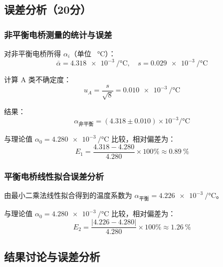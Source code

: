 \documentclass{../template/Report}%
\begin{document}
\begin{fullreportonly}
    \subsection{误差分析（20分）}

    \subsubsection{非平衡电桥测量的统计与误差}
    对非平衡电桥所得 $\alpha_i$（单位 \si{\per\degreeCelsius}）：
    \begin{equation}
        \bar{\alpha} = \SI{4.318e-3}{\per\degreeCelsius}, \quad s = \SI{0.029e-3}{\per\degreeCelsius}
    \end{equation}

    计算 A 类不确定度：
    \begin{equation}
        u_A = \frac{s}{\sqrt{8}} = \SI{0.010e-3}{\per\degreeCelsius}
    \end{equation}

    结果：
    \begin{equation}
        \alpha_{\text{非平衡}} = (\num{4.318} \pm \num{0.010}) \times 10^{-3} \si{\per\degreeCelsius}
    \end{equation}

    与理论值 $\alpha_{0} = \SI{4.280e-3}{\per\degreeCelsius}$ 比较，相对偏差为：
    \begin{equation}
        E_1 = \frac{4.318 - 4.280}{4.280} \times 100\% \approx \SI{0.89}{\percent}
    \end{equation}

    \subsubsection{平衡电桥线性拟合误差分析}
    由最小二乘法线性拟合得到的温度系数为 $\alpha_{\text{平衡}} = \SI{4.226e-3}{\per\degreeCelsius}$。

    与理论值 $\alpha_{0} = \SI{4.280e-3}{\per\degreeCelsius}$ 比较，相对偏差为：
    \begin{equation}
        E_2 = \frac{\left|4.226 - 4.280\right|}{4.280} \times 100\% \approx \SI{1.26}{\percent}
    \end{equation}

    \subsection{结果讨论与误差分析}


\end{fullreportonly}
\end{document}
